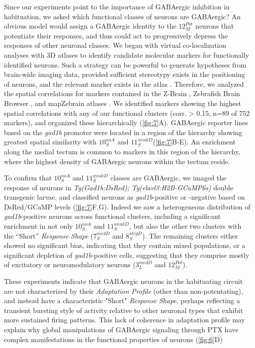 \documentclass[9pt,lineno]{RandlettLab_elife}
\begin{document}
Since our experiments point to the importance of GABAergic inhibition in habituation, we asked which functional classes of neurons are GABAergic? An obvious model would assign a GABAergic identity to the $12_{M}^{Pot}$ neurons that potentiate their responses, and thus could act to progressively depress the responses of other neuronal classes. We began with virtual co-localization analyses with 3D atlases to identify candidate molecular markers for functionally identified neurons. Such a strategy can be powerful to generate hypotheses from brain-wide imaging data, provided sufficient stereotypy exists in the positioning of neurons, and the relevant marker exists in the atlas \citep{Dunn2016-vt, Randlett2015-hy}. Therefore, we analyzed the spatial correlations for markers contained in the Z-Brain \citep{Randlett2015-hy}, Zebrafish Brain Browser \citep{Gupta2018-ik, Marquart2017-na, Tabor2018-bw}, and mapZebrain atlases \citep{Kunst2018-az, Shainer2022-sn}. We identified markers showing the highest spatial correlations with any of our functional clusters (corr. > 0.15, n=89 of 752 markers), and organized these hierarchically (\autoref{fig:7}A). GABAergic reporter lines based on the \emph{gad1b} promoter were located in a region of the hierarchy showing greatest spatial similarity with $10_{S}^{noA}$ and $11_{S}^{weakD}$(\autoref{fig:7}B-E). An enrichment along the medial tectum is common to markers in this region of the hierarchy, where the highest density of GABAergic neurons within the tectum reside. 

To confirm that $10_{S}^{noA}$ and $11_{S}^{weakD}$ classes are GABAergic, we imaged the response of neurons in \emph{Tg(Gad1b:DsRed); Tg(elavl3:H2B-GCaMP6s)} double transgenic larvae,  and classified neurons as \emph{gad1b}-positive or -negative based on DsRed/GCaMP levels (\autoref{fig:7}F,G). Indeed we saw a heterogeneous distribution of \emph{gad1b}-positive neurons across functional clusters, including a significant enrichment in not only $10_{S}^{noA}$ and $11_{S}^{weakD}$, but also the other two clusters with the “Short” \emph{Response Shape} ($7_{S}^{medD}$ and $8_{S}^{strgD}$). The remaining clusters either showed no significant bias, indicating that they contain mixed populations, or a significant depletion of \emph{gad1b}-positive cells, suggesting that they comprise mostly of excitatory or neuromodulatory neurons ($3_{L}^{medD}$ and $12_{M}^{Pot}$).

These experiments indicate that GABAergic neurons in the habituating circuit are not characterized by their \emph{Adaptation Profile} (other than non-potentating), and instead have a characteristic "Short"  \emph{Response Shape}, perhaps reflecting a transient bursting style of activity relative to other neuronal types that exhibit more sustained firing patterns. This lack of coherence in adaptation profile may explain why global manipulations of GABAergic signaling through PTX have complex manifestations in the functional properties of neurons  (\autoref{fig:6}D)
\end{document}
